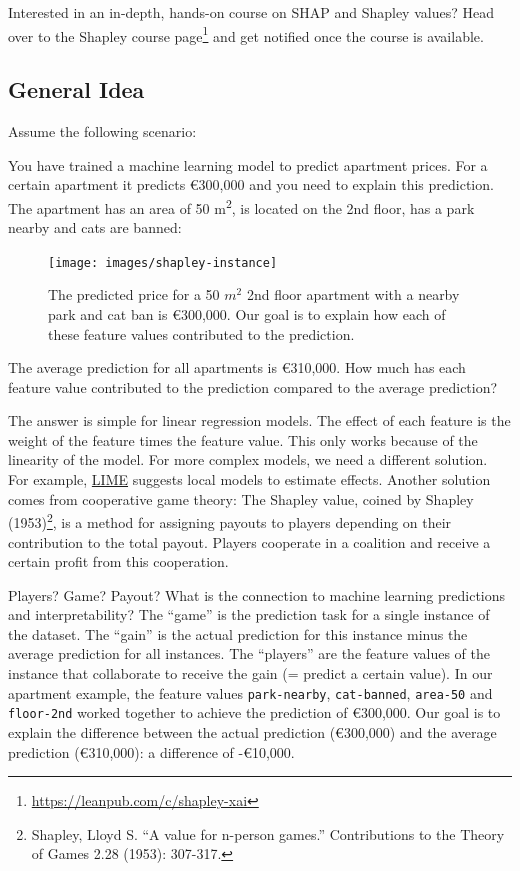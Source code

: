 \documentclass[
  12pt,
]{krantz}
\newenvironment{rmdnote}{}{}
\renewcommand{\href}[2]{#2\footnote{\url{#1}}}
\begin{document}
\begin{rmdnote}
Interested in an in-depth, hands-on course on SHAP and Shapley values?
Head over to \href{https://leanpub.com/c/shapley-xai}{the Shapley course page} and get notified once the course is available.
\end{rmdnote}

\hypertarget{general-idea}{%
\subsection{General Idea}\label{general-idea}}

Assume the following scenario:

You have trained a machine learning model to predict apartment prices.
For a certain apartment it predicts €300,000 and you need to explain this prediction.
The apartment has an area of 50 m\textsuperscript{2}, is located on the 2nd floor, has a park nearby and cats are banned:

\begin{figure}

{\centering \texttt{[image: images/shapley-instance]} 

}

\caption{The predicted price for a 50 $m^2$ 2nd floor apartment with a nearby park and cat ban is €300,000. Our goal is to explain how each of these feature values contributed to the prediction.}\label{fig:shapley-instance}
\end{figure}

The average prediction for all apartments is €310,000.
How much has each feature value contributed to the prediction compared to the average prediction?

The answer is simple for linear regression models.
The effect of each feature is the weight of the feature times the feature value.
This only works because of the linearity of the model.
For more complex models, we need a different solution.
For example, \protect\hyperlink{lime}{LIME} suggests local models to estimate effects.
Another solution comes from cooperative game theory:
The Shapley value, coined by Shapley (1953)\footnote{Shapley, Lloyd S. ``A value for n-person games.'' Contributions to the Theory of Games 2.28 (1953): 307-317.}, is a method for assigning payouts to players depending on their contribution to the total payout.
Players cooperate in a coalition and receive a certain profit from this cooperation.

Players?
Game?
Payout?
What is the connection to machine learning predictions and interpretability?
The ``game'' is the prediction task for a single instance of the dataset.
The ``gain'' is the actual prediction for this instance minus the average prediction for all instances.
The ``players'' are the feature values of the instance that collaborate to receive the gain (= predict a certain value).
In our apartment example, the feature values \texttt{park-nearby}, \texttt{cat-banned}, \texttt{area-50} and \texttt{floor-2nd} worked together to achieve the prediction of €300,000.
Our goal is to explain the difference between the actual prediction (€300,000) and the average prediction (€310,000): a difference of -€10,000.
\end{document}
